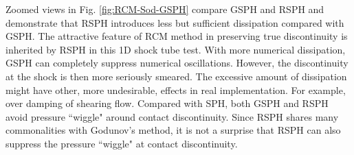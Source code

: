Zoomed views in Fig. \ref{fig:RCM-Sod-GSPH} compare GSPH and RSPH and demonstrate that RSPH introduces less but sufficient dissipation compared with GSPH. The attractive feature of RCM method in preserving true discontinuity is inherited by RSPH in this 1D shock tube test. With more numerical dissipation, GSPH can completely suppress numerical oscillations. However, the discontinuity at the shock is then more seriously smeared. The excessive amount of dissipation might have other, more undesirable, effects in real implementation. For example, over damping of shearing flow. Compared with SPH, both GSPH and RSPH avoid pressure ``wiggle" around contact discontinuity. Since RSPH shares many commonalities   with Godunov's method, it is not a surprise that RSPH can also suppress the pressure ``wiggle" at contact discontinuity.

